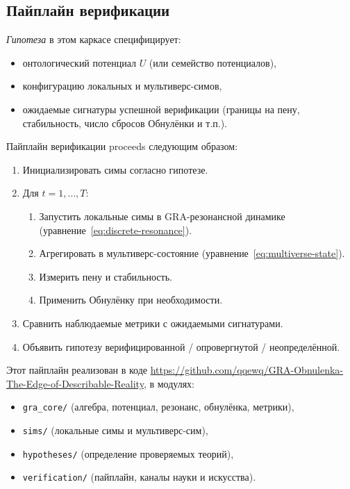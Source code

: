 \documentclass[11pt,a4paper]{article}
\begin{document}
\subsection{Пайплайн верификации}
\emph{Гипотеза} в этом каркасе специфицирует:
\begin{itemize}
  \item онтологический потенциал $U$ (или семейство потенциалов),
  \item конфигурацию локальных и мультиверс-симов,
  \item ожидаемые сигнатуры успешной верификации
        (границы на пену, стабильность, число сбросов Обнулёнки и т.п.).
\end{itemize}

Пайплайн верификации proceeds следующим образом:
\begin{enumerate}
  \item Инициализировать симы согласно гипотезе.
  \item Для $t = 1, \dots, T$:
    \begin{enumerate}
      \item Запустить локальные симы в GRA-резонансной динамике
            (уравнение~\eqref{eq:discrete-resonance}).
      \item Агрегировать в мультиверс-состояние
            (уравнение~\eqref{eq:multiverse-state}).
      \item Измерить пену и стабильность.
      \item Применить Обнулёнку при необходимости.
    \end{enumerate}
  \item Сравнить наблюдаемые метрики с ожидаемыми сигнатурами.
  \item Объявить гипотезу верифицированной / опровергнутой /
        неопределённой.
\end{enumerate}

Этот пайплайн реализован в коде
\url{https://github.com/qqewq/GRA-Obnulenka-The-Edge-of-Describable-Reality},
в модулях:
\begin{itemize}
  \item \texttt{gra\_core/} (алгебра, потенциал, резонанс, обнулёнка, метрики),
  \item \texttt{sims/} (локальные симы и мультиверс-сим),
  \item \texttt{hypotheses/} (определение проверяемых теорий),
  \item \texttt{verification/} (пайплайн, каналы науки и искусства).
\end{itemize}
\end{document}
